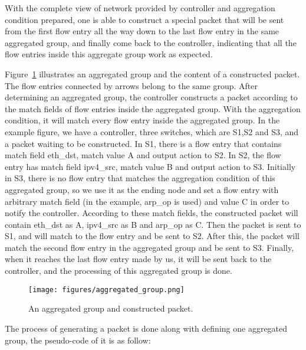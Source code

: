 With the complete view of network provided by controller and aggregation condition prepared, one is able to construct a special packet that will be sent from the first flow entry all the way down to the last flow entry in the same aggregated group, and finally come back to the controller, indicating that all the flow entries inside this aggregate group work as expected. 

Figure~\ref{aggregated_group} illustrates an aggregated group and the content of a constructed packet. The flow entries connected by arrows belong to the same group. After determining an aggregated group, the controller constructs a packet according to the match fields of flow entries inside the aggregated group. With the aggregation condition, it will match every flow entry inside the aggregated group. In the example figure, we have a controller, three switches, which are S1,S2 and S3, and a packet waiting to be constructed. In S1, there is a flow entry that contains match field eth\_dst, match value A and output action to S2. In S2, the flow entry has match field ipv4\_src, match value B and output action to S3. Initially in S3, there is no flow entry that matches the aggregation condition of this aggregated group, so we use it as the ending node and set a flow entry with arbitrary match field (in the example, arp\_op is used) and value C in order to notify the controller. According to these match fields, the constructed packet will contain eth\_dst as A, ipv4\_src as B and arp\_op as C. Then the packet is sent to S1, and will match to the flow entry and be sent to S2. After this, the packet will match the second flow entry in the aggregated group and be sent to S3. Finally, when it reaches the last flow entry made by us, it will be sent back to the controller, and the processing of this aggregated group is done. 

\begin{figure}[H]
\begin{center} 
\texttt{[image: figures/aggregated\_group.png]}
\end{center}
\caption{An aggregated group and constructed packet.}
\label{aggregated_group}
\end{figure}

The process of generating a packet is done along with defining one aggregated group, the pseudo-code of it is as follow:

